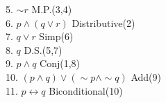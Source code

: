 \documentclass{article}
\begin{document}
5. $\sim r$ \hspace*{\fill} M.P.(3,4)  \\
6. $p \wedge (q\vee r)$\hspace*{\fill} Distributive(2)  \\
7. $q \vee r$ \hspace*{\fill} Simp(6)  \\
8. $q$ \hspace*{\fill} D.S.(5,7)  \\
9. $p \wedge q$ \hspace*{\fill} Conj(1,8)  \\
10. $(p \wedge q) \vee (\sim p \wedge \sim q)$ \hspace*{\fill} Add(9)  \\
11. $p \leftrightarrow q$ \hspace*{\fill} Biconditional(10)  \\
\end{document}
